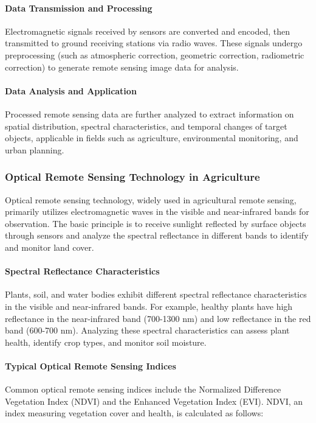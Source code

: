 \paragraph{Data Transmission and Processing} Electromagnetic signals received by sensors are converted and encoded, then transmitted to ground receiving stations via radio waves. These signals undergo preprocessing (such as atmospheric correction, geometric correction, radiometric correction) to generate remote sensing image data for analysis.

\paragraph{Data Analysis and Application} Processed remote sensing data are further analyzed to extract information on spatial distribution, spectral characteristics, and temporal changes of target objects, applicable in fields such as agriculture, environmental monitoring, and urban planning.

\subsubsection{Optical Remote Sensing Technology in Agriculture}

Optical remote sensing technology, widely used in agricultural remote sensing, primarily utilizes electromagnetic waves in the visible and near-infrared bands for observation. The basic principle is to receive sunlight reflected by surface objects through sensors and analyze the spectral reflectance in different bands to identify and monitor land cover.

\paragraph{Spectral Reflectance Characteristics} Plants, soil, and water bodies exhibit different spectral reflectance characteristics in the visible and near-infrared bands. For example, healthy plants have high reflectance in the near-infrared band (700-1300 nm) and low reflectance in the red band (600-700 nm). Analyzing these spectral characteristics can assess plant health, identify crop types, and monitor soil moisture.

\paragraph{Typical Optical Remote Sensing Indices} Common optical remote sensing indices include the Normalized Difference Vegetation Index (NDVI)\cite{Normaliz41:online} and the Enhanced Vegetation Index (EVI)\cite{Enhanced85:online}. NDVI\cite{Normaliz41:online}, an index measuring vegetation cover and health, is calculated as follows:

